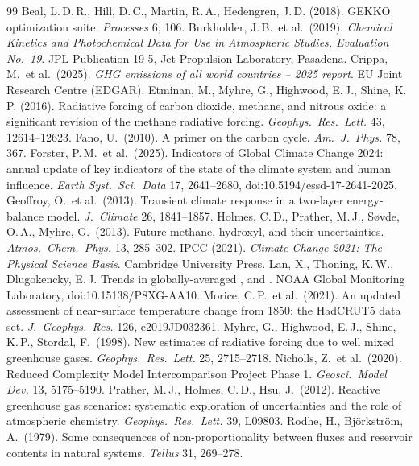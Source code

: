 \documentclass[11pt,a4paper]{article}
\begin{document}
\small
\begin{thebibliography}{99}\itemsep0pt
 Beal, L.\,D.\,R., Hill, D.\,C., Martin, R.\,A., Hedengren, J.\,D. (2018). GEKKO optimization suite. \emph{Processes} 6, 106.
 Burkholder, J.\,B.\ et al.\ (2019). \emph{Chemical Kinetics and Photochemical Data for Use in Atmospheric Studies, Evaluation No.\ 19}. JPL Publication 19-5, Jet Propulsion Laboratory, Pasadena.
 Crippa, M.\ et al.\ (2025). \emph{GHG emissions of all world countries -- 2025 report}. EU Joint Research Centre (EDGAR).
 Etminan, M., Myhre, G., Highwood, E.\,J., Shine, K.\,P. (2016). Radiative forcing of carbon dioxide, methane, and nitrous oxide: a significant revision of the methane radiative forcing. \emph{Geophys.\ Res.\ Lett.} 43, 12614--12623.
 Fano, U.\ (2010). A primer on the carbon cycle. \emph{Am.\ J.\ Phys.} 78, 367.
 Forster, P.\,M.\ et al.\ (2025). Indicators of Global Climate Change 2024: annual update of key indicators of the state of the climate system and human influence. \emph{Earth Syst.\ Sci.\ Data} 17, 2641--2680, doi:10.5194/essd-17-2641-2025.
 Geoffroy, O.\ et al.\ (2013). Transient climate response in a two-layer energy-balance model. \emph{J.\ Climate} 26, 1841--1857.
 Holmes, C.\,D., Prather, M.\,J., S{\o}vde, O.\,A., Myhre, G.\ (2013). Future methane, hydroxyl, and their uncertainties. \emph{Atmos.\ Chem.\ Phys.} 13, 285--302.
 IPCC (2021). \emph{Climate Change 2021: The Physical Science Basis}. Cambridge University Press.
 Lan, X., Thoning, K.\,W., Dlugokencky, E.\,J. Trends in globally-averaged ,  and . NOAA Global Monitoring Laboratory, doi:10.15138/P8XG-AA10.
 Morice, C.\,P.\ et al.\ (2021). An updated assessment of near-surface temperature change from 1850: the HadCRUT5 data set. \emph{J.\ Geophys.\ Res.} 126, e2019JD032361.
 Myhre, G., Highwood, E.\,J., Shine, K.\,P., Stordal, F.\ (1998). New estimates of radiative forcing due to well mixed greenhouse gases. \emph{Geophys.\ Res.\ Lett.} 25, 2715--2718.
 Nicholls, Z.\ et al.\ (2020). Reduced Complexity Model Intercomparison Project Phase 1. \emph{Geosci.\ Model Dev.} 13, 5175--5190.
 Prather, M.\,J., Holmes, C.\,D., Hsu, J.\ (2012). Reactive greenhouse gas scenarios: systematic exploration of uncertainties and the role of atmospheric chemistry. \emph{Geophys.\ Res.\ Lett.} 39, L09803.
 Rodhe, H., Bj{\"o}rkstr{\"o}m, A.\ (1979). Some consequences of non-proportionality between fluxes and reservoir contents in natural systems. \emph{Tellus} 31, 269--278.

\end{thebibliography}
\end{document}
